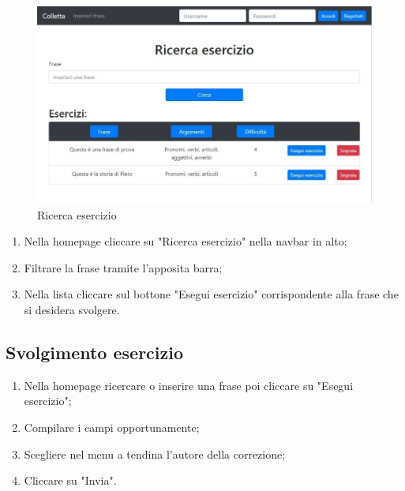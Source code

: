 \documentclass[11pt,a4paper]{article}
\begin{document}
{	\begin{figure}[h]
		\centering
		\includegraphics[scale=0.65]{images/ricerca.jpg}
		\caption{Ricerca esercizio}
	\end{figure}

	\begin{enumerate}
		\item Nella homepage cliccare su "Ricerca esercizio" nella navbar in alto;
		\item Filtrare la frase tramite l'apposita barra;
		\item Nella lista cliccare sul bottone "Esegui esercizio" corrispondente alla frase che si desidera svolgere.
	\end{enumerate}
	
	\subsection{Svolgimento esercizio}
	\begin{enumerate}
		\item Nella homepage ricercare o inserire una frase poi cliccare su "Esegui esercizio";
		\item Compilare i campi opportunamente;
		\item Scegliere nel menu a tendina l'autore della correzione;
		\item Cliccare su "Invia".
	\end{enumerate}

}
\end{document}
